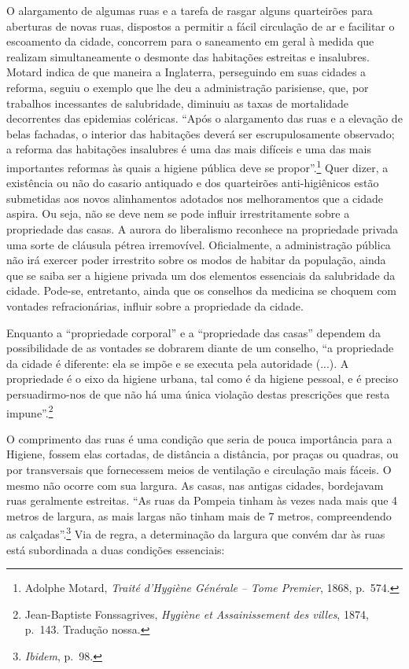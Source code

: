 O alargamento de algumas ruas e a tarefa de rasgar alguns quarteirões
para aberturas de novas ruas, dispostos a permitir a fácil circulação de
ar e facilitar o escoamento da cidade, concorrem para o saneamento em
geral à medida que realizam simultaneamente o desmonte das habitações
estreitas e insalubres. Motard indica de que maneira a Inglaterra,
perseguindo em suas cidades a reforma, seguiu o exemplo que lhe deu a
administração parisiense, que, por trabalhos incessantes de salubridade,
diminuiu as taxas de mortalidade decorrentes das epidemias coléricas.
``Após o alargamento das ruas e a elevação de belas fachadas, o interior
das habitações deverá ser escrupulosamente observado; a reforma das
habitações insalubres é uma das mais difíceis e uma das mais importantes
reformas às quais a higiene pública deve se propor''.\footnote{Adolphe
  Motard, \emph{Traité d'Hygiène Générale} \emph{-- Tome Premier}, 1868,
  p.~574.} Quer dizer, a existência ou não do casario antiquado e dos
quarteirões anti-higiênicos estão submetidas aos novos alinhamentos
adotados nos melhoramentos que a cidade aspira. Ou seja, não se deve nem
se pode influir irrestritamente sobre a propriedade das casas. A aurora
do liberalismo reconhece na propriedade privada uma sorte de cláusula
pétrea irremovível. Oficialmente, a administração pública não irá
exercer poder irrestrito sobre os modos de habitar da população, ainda
que se saiba ser a higiene privada um dos elementos essenciais da
salubridade da cidade. Pode-se, entretanto, ainda que os conselhos da
medicina se choquem com vontades refracionárias, influir sobre a
propriedade da cidade.

Enquanto a ``propriedade corporal'' e a ``propriedade das casas''
dependem da possibilidade de as vontades se dobrarem diante de um
conselho, ``a propriedade da cidade é diferente: ela se impõe e se
executa pela autoridade (...). A propriedade é o eixo da higiene urbana,
tal como é da higiene pessoal, e é preciso persuadirmo-nos de que não há
uma única violação destas prescrições que resta impune''.\footnote{Jean-Baptiste
  Fonssagrives, \emph{Hygiène et Assainissement des villes}, 1874,
  p.~143. Tradução nossa.}

O comprimento das ruas é uma condição que seria de pouca importância
para a Higiene, fossem elas cortadas, de distância a distância, por
praças ou quadras, ou por transversais que fornecessem meios de
ventilação e circulação mais fáceis. O mesmo não ocorre com sua largura.
As casas, nas antigas cidades, bordejavam ruas geralmente estreitas.
``As ruas da Pompeia tinham às vezes nada mais que 4 metros de largura,
as mais largas não tinham mais de 7 metros, compreendendo as
calçadas''.\footnote{\emph{Ibidem}, p.~98.} Via de regra, a determinação
da largura que convém dar às ruas está subordinada a duas condições
essenciais:

